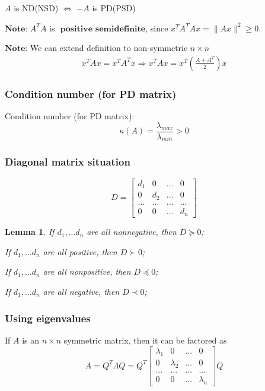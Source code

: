 \documentclass[11pt,a4paper]{article}
\newtheorem{lemma}{Lemma}
\begin{document}
$A$ is ND(NSD) $\Leftrightarrow$ $-A$ is PD(PSD)

$\textbf{Note:}$ $A^TA$ is $\textbf{ positive semidefinite}$, since $x^TA^TAx=\|Ax\|^2\geq 0$.

$\textbf{Note:}$ We can extend definition to non-symmetric $n\times n$
\begin{equation}
    \begin{aligned}
        x^TAx=x^TA^Tx \Rightarrow x^TAx=x^T(\frac{A+A^T}{2})x
    \end{aligned}
    \nonumber
\end{equation}

\subsubsection{Condition number (for PD matrix)}
Condition number (for PD matrix):$$\kappa (A)=\frac{\lambda_{max}}{\lambda_{min}}>0$$











\subsubsection{Diagonal matrix situation}
$$D=\begin{bmatrix}
    d_1&0&... &0\\0&d_2&...&0\\...&...&...&...\\0&0&...&d_n
\end{bmatrix}$$
\begin{lemma}
    If $d_1,...d_n$ are all nonnegative, then $D\succeq 0$;

    If $d_1,...d_n$ are all positive, then $D\succ 0$;
    
    If $d_1,...d_n$ are all nonpositive, then $D\preceq 0$;
    
    If $d_1,...d_n$ are all negative, then $D\prec 0$;
\end{lemma}

\subsubsection{Using eigenvalues}
If $A$ is an $n \times n$ symmetric matrix, then it can be factored as
    $$A=Q^T\Lambda Q=Q^T
    \begin{bmatrix}
        \lambda_1&0&... &0\\
        0&\lambda_2&...&0\\
        ...&...&...&...\\
        0&0&...&\lambda_n
    \end{bmatrix}Q$$
\end{document}
